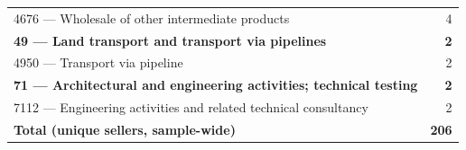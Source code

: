 \begin{longtable}{lr}
\hspace{1em}4676 --- Wholesale of other intermediate products & 4 \\
\addlinespace[2pt]\textbf{49 --- Land transport and transport via pipelines} & \textbf{2} \\
\hspace{1em}4950 --- Transport via pipeline & 2 \\
\addlinespace[2pt]\textbf{71 --- Architectural and engineering activities; technical testing} & \textbf{2} \\
\hspace{1em}7112 --- Engineering activities and related technical consultancy & 2 \\
\midrule
\textbf{Total (unique sellers, sample-wide)} & \textbf{206} \\
\end{longtable}
